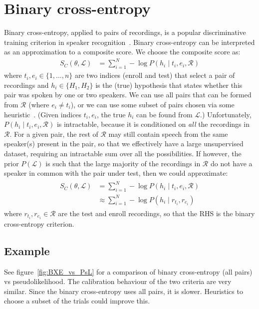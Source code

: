 \documentclass[a4paper,oneside,12pt,english]{report}
\def\Lset{\mathcal{L}}
\def\Rset{\mathcal{R}}
\begin{document}
\section{Binary cross-entropy}
Binary cross-entropy, applied to pairs of recordings, is a popular discriminative training criterion in speaker recognition~\cite{STBUFusion,Sandro_pairs,calibration_Odyssey14,end2end_google,end2end}. Binary cross-entropy can be interpreted as an approximation to a composite score. We choose the composite score as:
\begin{align}
S_C(\theta,\Lset) &= \sum_{i=1}^N -\log P(h_i \mid t_i, e_i, \Rset)
\end{align} 
where $t_i,e_i\in\{1,\ldots,n\}$ are two indices (enroll and test) that select a pair of recordings and $h_i\in\{H_1,H_2\}$ is the (true) hypothesis that states whether this pair was spoken by one or two speakers. We can use all pairs that can be formed from $\Rset$ (where $e_i\ne t_i$), or we can use some subset of pairs chosen via some heuristic~\cite{Sandro_PSVM}. (Given indices $t_i,e_i$, the true $h_i$ can be found from $\Lset$.) Unfortunately, $P(h_i \mid t_i, e_i, \Rset)$ is intractable, because it is conditioned on \emph{all} the recordings in $\Rset$. For a given pair, the rest of $\Rset$ may still contain speech from the same speaker(s) present in the pair, so that we effectively have a large unsupervised dataset, requiring an intractable sum over all the possibilities. If however, the prior $P(\Lset)$ is such that the large majority of the recordings in $\Rset$ do not have a speaker in common with the pair under test, then we could approximate:
\begin{align}
\begin{split}
S_C(\theta,\Lset) &= \sum_{i=1}^N -\log P(h_i \mid t_i, e_i, \Rset) \\
&\approx \sum_{i=1}^N -\log P(h_i \mid r_{t_i}, r_{e_i})
\end{split}
\end{align} 
where $r_{t_i}, r_{e_i}\in\Rset$ are the test and enroll recordings, so that the RHS is the binary cross-entropy criterion.

\subsection{Example}
See figure~\ref{fig:BXE_vs_PsL} for a comparison of binary cross-entropy (all pairs) vs pseudolikelihood. The calibration behaviour of the two criteria are very similar. Since the binary cross-entropy uses all pairs, it is slower. Heuristics to choose a subset of the trials could improve this.
\end{document}
